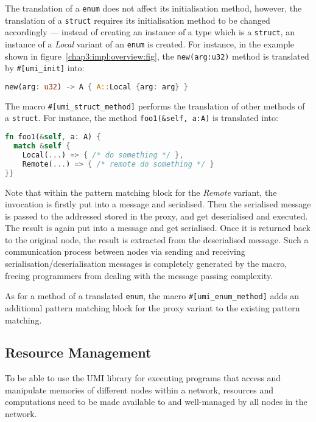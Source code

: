 The translation of a \texttt{enum} does not affect its initialisation method, however, the translation of a \texttt{struct} requires its initialisation method to be changed accordingly --- instead of creating an instance of a type which is a \texttt{struct}, an instance of a \textit{Local} variant of an \texttt{enum} is created. For instance, in the example shown in figure~\ref{chap3:impl:overview:fig}, the \texttt{new(arg:u32)} method is translated by \texttt{\#[umi\_init]} into:
\begin{lstlisting}[language=Rust, style=boxed, basicstyle=\footnotesize\ttfamily]
new(arg: u32) -> A { A::Local {arg: arg} }
\end{lstlisting}

The macro \texttt{\#[umi\_struct\_method]} performs the translation of other methods of a \texttt{struct}. For instance, the method \texttt{foo1(\&self, a:A)} is translated into:
\begin{lstlisting}[language=Rust, style=boxed, basicstyle=\footnotesize\ttfamily]
fn foo1(&self, a: A) {
  match &self {
    Local(...) => { /* do something */ },
    Remote(...) => { /* remote do something */ }
}}
\end{lstlisting}
Note that within the pattern matching block for the \emph{Remote} variant, the invocation is firstly put into a message and serialised. Then the serialised message is passed to the addressed stored in the proxy, and get deserialised and executed. The result is again put into a message and get serialised. Once it is returned back to the original node, the result is extracted from the deserialised message. Such a communication process between nodes via sending and receiving serialisation/deserialisation messages is completely generated by the macro, freeing programmers from dealing with the message passing complexity.

As for a method of a translated \texttt{enum}, the macro \texttt{\#[umi\_enum\_method]} adds an additional pattern matching block for the proxy variant to the existing pattern matching.

\subsection{Resource Management}
\label{chap3:impl:resource}
To be able to use the UMI library for executing programs that access and manipulate memories of different nodes within a network, resources and computations need to be made available to and well-managed by all nodes in the network.

